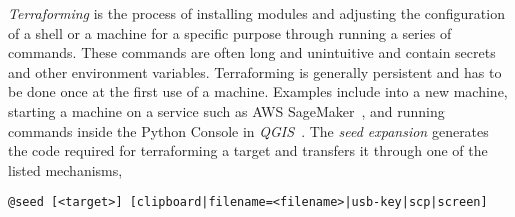 
\emph{Terraforming} is the process of installing modules and adjusting the configuration of a shell or a machine for a specific purpose through running a series of commands. These commands are often long and unintuitive and contain secrets and other environment variables. Terraforming is generally persistent and has to be done once at the first use of a machine. Examples include  into a new machine, starting a machine on a service such as AWS SageMaker~\cite{sagemaker}, and running commands inside the Python Console in \emph{QGIS}~\cite{QGIS_python_console}. The \emph{seed expansion} generates the code required for terraforming a target and transfers it through one of the listed mechanisms,
%
\begin{verbatim}
@seed [<target>] [clipboard|filename=<filename>|usb-key|scp|screen]
\end{verbatim}
